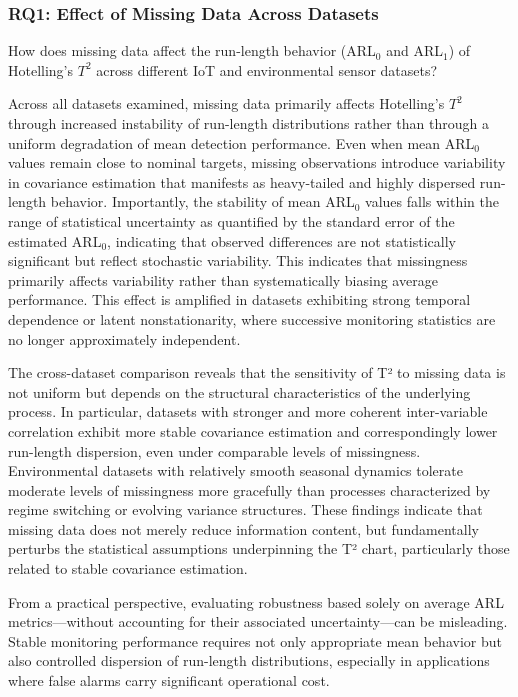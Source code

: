 \subsubsection{RQ1: Effect of Missing Data Across Datasets}

How does missing data affect the run-length behavior (\ac{ARL}$_0$ and \ac{ARL}$_1$) of Hotelling’s $T^2$ across different IoT and environmental sensor datasets?

Across all datasets examined, missing data primarily affects Hotelling’s $T^2$ through increased instability of run-length distributions rather than through a uniform degradation of mean detection performance. Even when mean \ac{ARL}$_0$ values remain close to nominal targets, missing observations introduce variability in covariance estimation that manifests as heavy-tailed and highly dispersed run-length behavior. Importantly, the stability of mean \ac{ARL}$_0$ values falls within the range of statistical uncertainty as quantified by the standard error of the estimated \ac{ARL}$_0$, indicating that observed differences are not statistically significant but reflect stochastic variability. This indicates that missingness primarily affects variability rather than systematically biasing average performance. This effect is amplified in datasets exhibiting strong temporal dependence or latent nonstationarity, where successive monitoring statistics are no longer approximately independent.

The cross-dataset comparison reveals that the sensitivity of T² to missing data is not uniform but depends on the structural characteristics of the underlying process. In particular, datasets with stronger and more coherent inter-variable correlation exhibit more stable covariance estimation and correspondingly lower run-length dispersion, even under comparable levels of missingness. Environmental datasets with relatively smooth seasonal dynamics tolerate moderate levels of missingness more gracefully than processes characterized by regime switching or evolving variance structures. These findings indicate that missing data does not merely reduce information content, but fundamentally perturbs the statistical assumptions underpinning the T² chart, particularly those related to stable covariance estimation.

From a practical perspective, evaluating robustness based solely on average \ac{ARL} metrics—without accounting for their associated uncertainty—can be misleading. Stable monitoring performance requires not only appropriate mean behavior but also controlled dispersion of run-length distributions, especially in applications where false alarms carry significant operational cost.

